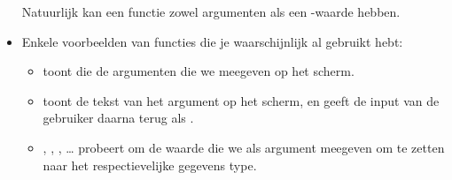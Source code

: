 \begin{itemize}
		\newline
		Natuurlijk kan een functie zowel argumenten als een -waarde hebben.
	\item
		Enkele voorbeelden van functies die je waarschijnlijk al gebruikt hebt:
		\begin{itemize}
			\item
				\newline
				toont die de argumenten die we meegeven op het scherm.
			\item
				\newline
				toont de tekst van het argument op het scherm,
				en geeft de input van de gebruiker daarna terug als .
			\item
				, , , \dots
				\newline
				probeert om de waarde die we als argument meegeven om te zetten naar het respectievelijke gegevens type.
		\end{itemize}
\end{itemize}